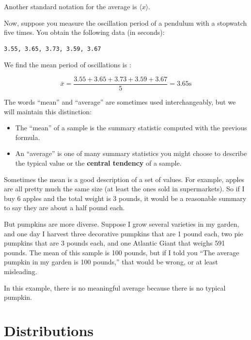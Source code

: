 Another standard notation for the average is $\langle x\rangle$.

Now, suppose you measure the oscillation period of a pendulum with a stopwatch five times. You obtain the following data (in seconds):
\begin{verbatim}
3.55, 3.65, 3.73, 3.59, 3.67
\end{verbatim}

We find the mean period of oscillations is :

\[ \bar{x} = \frac{3.55+ 3.65+ 3.73+3.59+3.67}{5} = 3.65 \text{s}\]

The words ``mean'' and ``average'' are sometimes used interchangeably,
but we will maintain this distinction:

\begin{itemize}

\item The ``mean'' of a sample is the summary statistic computed with
  the previous formula.

\item An ``average'' is one of many summary statistics you might
  choose to describe the typical value or the
  {\bf central tendency} of a sample.

\end{itemize}

Sometimes the mean is a good description of a set of values.  For
example, apples are all pretty much the same size (at least the ones
sold in supermarkets).  So if I buy 6 apples and the total weight is 3
pounds, it would be a reasonable summary to say they are about a half
pound each.

But pumpkins are more diverse.  Suppose I grow several varieties in my
garden, and one day I harvest three decorative pumpkins that are 1
pound each, two pie pumpkins that are 3 pounds each, and one Atlantic
Giant that weighs 591 pounds.  The mean of
this sample is 100 pounds, but if I told you ``The average pumpkin
in my garden is 100 pounds,'' that would be wrong, or at least
misleading.

In this example, there is no meaningful average because
there is no typical pumpkin.



\section{Distributions}
\label{distributions}

